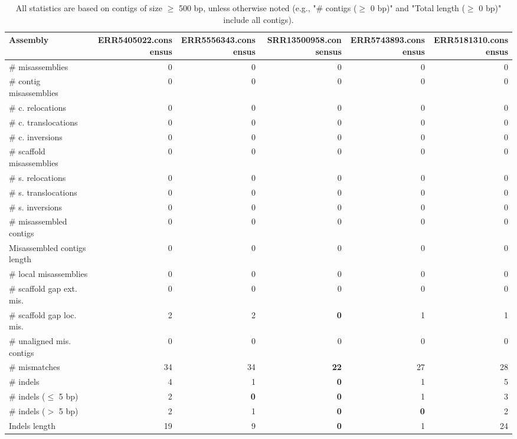 \documentclass[12pt,a4paper]{article}
\begin{document}
\begin{table}[ht]
\begin{center}
\caption{All statistics are based on contigs of size $\geq$ 500 bp, unless otherwise noted (e.g., "\# contigs ($\geq$ 0 bp)" and "Total length ($\geq$ 0 bp)" include all contigs).}
\begin{tabular}{|l*{5}{|r}|}
\hline
Assembly & ERR5405022.consensus & ERR5556343.consensus & SRR13500958.consensus & ERR5743893.consensus & ERR5181310.consensus \\ \hline
\# misassemblies & 0 & 0 & 0 & 0 & 0 \\ \hline
\hspace{2mm}\# contig misassemblies & 0 & 0 & 0 & 0 & 0 \\ \hline
\hspace{5mm}\# c. relocations & 0 & 0 & 0 & 0 & 0 \\ \hline
\hspace{5mm}\# c. translocations & 0 & 0 & 0 & 0 & 0 \\ \hline
\hspace{5mm}\# c. inversions & 0 & 0 & 0 & 0 & 0 \\ \hline
\hspace{2mm}\# scaffold misassemblies & 0 & 0 & 0 & 0 & 0 \\ \hline
\hspace{5mm}\# s. relocations & 0 & 0 & 0 & 0 & 0 \\ \hline
\hspace{5mm}\# s. translocations & 0 & 0 & 0 & 0 & 0 \\ \hline
\hspace{5mm}\# s. inversions & 0 & 0 & 0 & 0 & 0 \\ \hline
\# misassembled contigs & 0 & 0 & 0 & 0 & 0 \\ \hline
Misassembled contigs length & 0 & 0 & 0 & 0 & 0 \\ \hline
\# local misassemblies & 0 & 0 & 0 & 0 & 0 \\ \hline
\# scaffold gap ext. mis. & 0 & 0 & 0 & 0 & 0 \\ \hline
\# scaffold gap loc. mis. & 2 & 2 & {\bf 0} & 1 & 1 \\ \hline
\# unaligned mis. contigs & 0 & 0 & 0 & 0 & 0 \\ \hline
\# mismatches & 34 & 34 & {\bf 22} & 27 & 28 \\ \hline
\# indels & 4 & 1 & {\bf 0} & 1 & 5 \\ \hline
\hspace{5mm}\# indels ($\leq$ 5 bp) & 2 & {\bf 0} & {\bf 0} & 1 & 3 \\ \hline
\hspace{5mm}\# indels ($>$ 5 bp) & 2 & 1 & {\bf 0} & {\bf 0} & 2 \\ \hline
Indels length & 19 & 9 & {\bf 0} & 1 & 24 \\ \hline
\end{tabular}
\end{center}
\end{table}
\end{document}

